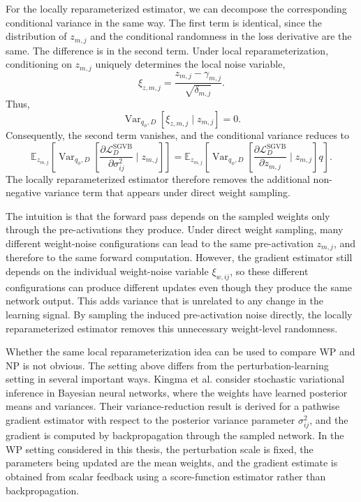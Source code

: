 For the locally reparameterized estimator, we can decompose the corresponding conditional variance in the same way. The first term is identical, since the distribution of \(z_{m,j}\) and the conditional randomness in the loss derivative are the same. The difference is in the second term. Under local reparameterization, conditioning on \(z_{m,j}\) uniquely determines the local noise variable,
\[
\xi_{z,m,j}
=
\frac{z_{m,j}-\gamma_{m,j}}
{\sqrt{\delta_{m,j}}}.
\]
Thus,
\[
\operatorname{Var}_{q_\phi,D}
\left[
\xi_{z,m,j}
\mid z_{m,j}
\right]
=
0.
\]
Consequently, the second term vanishes, and the conditional variance reduces to
\[
\mathbb{E}_{z_{m,j}}
\left[
\operatorname{Var}_{q_\phi,D}
\left[
\frac{\partial \mathcal{L}^{\mathrm{SGVB}}_D}
{\partial \sigma_{ij}^2}
\mid z_{m,j}
\right]
\right]
=
\mathbb{E}_{z_{m,j}}
\left[
\operatorname{Var}_{q_\phi,D}
\left[
\frac{\partial \mathcal{L}^{\mathrm{SGVB}}_D}
{\partial z_{m,j}}
\mid z_{m,j}
\right]
q
\right].
\]
The locally reparameterized estimator therefore removes the additional non-negative variance term that appears under direct weight sampling.

The intuition is that the forward pass depends on the sampled weights only through the pre-activations they produce. Under direct weight sampling, many different weight-noise configurations can lead to the same pre-activation \(z_{m,j}\), and therefore to the same forward computation. However, the gradient estimator still depends on the individual weight-noise variable \(\xi_{w,ij}\), so these different configurations can produce different updates even though they produce the same network output. This adds variance that is unrelated to any change in the learning signal. By sampling the induced pre-activation noise directly, the locally reparameterized estimator removes this unnecessary weight-level randomness.

Whether the same local reparameterization idea can be used to compare WP and NP is not obvious. The setting above differs from the perturbation-learning setting in several important ways. Kingma et al. consider stochastic variational inference in Bayesian neural networks, where the weights have learned posterior means and variances. Their variance-reduction result is derived for a pathwise gradient estimator with respect to the posterior variance parameter \(\sigma_{ij}^{2}\), and the gradient is computed by backpropagation through the sampled network. In the WP setting considered in this thesis, the perturbation scale is fixed, the parameters being updated are the mean weights, and the gradient estimate is obtained from scalar feedback using a score-function estimator rather than backpropagation.

